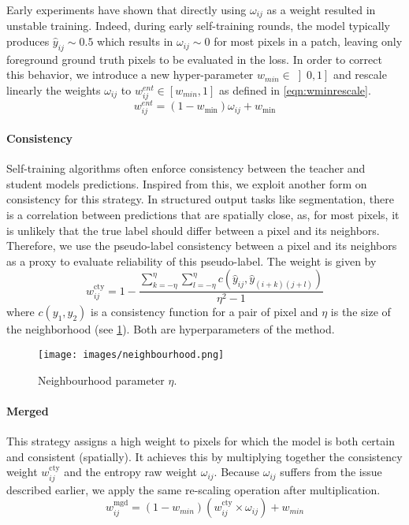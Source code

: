 Early experiments have shown that directly using $\omega_{ij}$ as a weight resulted in unstable training. Indeed, during early self-training rounds, the model typically produces $\hat{y}_{ij} \sim 0.5$ which results in $\omega_{ij} \sim 0$ for most pixels in a patch, leaving only foreground ground truth pixels to be evaluated in the loss. In order to correct this behavior, we introduce a new hyper-parameter $w_{min} \in \left]0, 1\right]$ and rescale linearly the weights $\omega_{ij}$ to $w^{ent}_{ij} \in [w_{min},1]$ as defined in \cref{eqn:wminrescale}.
\begin{equation}
w^{ent}_{ij} = \left(1 - w_{\text{min}}\right) \omega_{ij} + w_{\text{min}}
\label{eqn:wminrescale}
\end{equation}

\paragraph{Consistency} Self-training algorithms often enforce consistency between the teacher and student models predictions. Inspired from this, we exploit another form on consistency for this strategy. In structured output tasks like segmentation, there is a correlation between predictions that are spatially close, as, for most pixels, it is unlikely that the true label should differ between a pixel and its neighbors. Therefore, we use the pseudo-label consistency between a pixel and its neighbors as a proxy to evaluate reliability of this pseudo-label. The weight is given by
\begin{equation}
w^{\text{cty}}_{ij} = 1 - \dfrac{\sum_{k=-\eta}^{\eta} \sum_{l=-\eta}^{\eta} c(\hat{y}_{ij},  \hat{y}_{(i+k)(j+l)})}{\eta^2 - 1}
\end{equation}
where $c(y_1,y_2)$ is a consistency function for a pair of pixel and $\eta$ is the size of the neighborhood (see \cref{fig:neighbourhood}). Both are hyperparameters of the method.

\begin{figure}
    \centering
    \texttt{[image: images/neighbourhood.png]}
    \caption{Neighbourhood parameter $\eta$.}
    \label{fig:neighbourhood}
\end{figure}

\paragraph{Merged} This strategy assigns a high weight to pixels for which the model is both certain and consistent (spatially). It achieves this by multiplying together the consistency weight $w^{\text{cty}}_{ij}$ and the entropy raw weight $\omega_{ij}$. Because $\omega_{ij}$ suffers from the issue described earlier, we apply the same re-scaling operation after multiplication.
\begin{equation}
w^{\text{mgd}}_{ij} = (1 - w_{min}) \left(w^{\text{cty}}_{ij} \times \omega_{ij}\right) + w_{min}
\end{equation}


